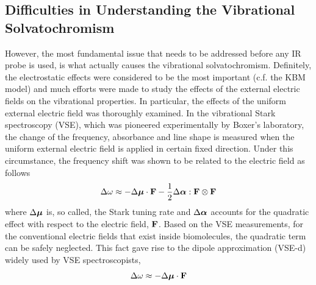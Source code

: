 \documentclass[a4paper,titlepage,twoside,fleqn,12pt]{book}
\newcommand{\BM}[1]{\ensuremath{\mbox{\boldmath${#1}$}}}
\begin{document}
\begin{refsection}
\section{Difficulties in Understanding the Vibrational Solvatochromism}
%
However, the most fundamental issue that needs to be addressed 
before any IR probe is used, is what actually causes the vibrational solvatochromism.
Definitely, the electrostatic effects were considered to be the most important
(c.f. the KBM model) and much efforts were made to study the effects of the external
electric fields on the vibrational properties.\citep{Kim.Cho.ChemRev.2013} 
In particular, the effects of the
uniform external electric field was thoroughly examined.\citep{Hush.Reimers.JPC.1995,
Reimers.Zeng.Hush.JPC.1996,Andrews.Boxer.JCPA.2002,Cho.JCP.2009} 
In the vibrational Stark spectroscopy (VSE)\citep{Hush.Reimers.JPC.1995,Reimers.Zeng.Hush.JPC.1996}, 
which was pioneered experimentally by Boxer's laboratory\citep{Bublitz.Boxer.AnnuRevPhysChem.1997}, 
the change of the frequency, absorbance
and line shape is measured when the uniform external electric field is applied in certain fixed direction.
Under this circumstance, the frequency shift
was shown to be related to the electric field as follows\citep{Hush.Reimers.JPC.1995,Reimers.Zeng.Hush.JPC.1996}
%
\begin{equation} \label{e:vse-shift-full}
 \Delta \omega \approx - \Delta {\BM \mu} \cdot {\bf F} - \frac{1}{2} \Delta {\BM \alpha} : {\bf F} \otimes {\bf F}
\end{equation}
%
where $\Delta {\BM \mu}$ is, so called, the Stark tuning rate
and $\Delta {\BM \alpha}$ accounts for the quadratic effect with respect to 
the electric field, ${\bf F}$. 
Based on the VSE measurements, for the conventional
electric fields that exist inside biomolecules, the quadratic term
can be safely neglected. 
This fact gave rise to the dipole approximation (VSE-d)
widely used by VSE spectroscopists,
%
\begin{equation} \label{e:vse-shift-dipole}
 \Delta \omega \approx - \Delta {\BM \mu} \cdot {\bf F}

\end{equation}
\end{refsection}
\end{document}
